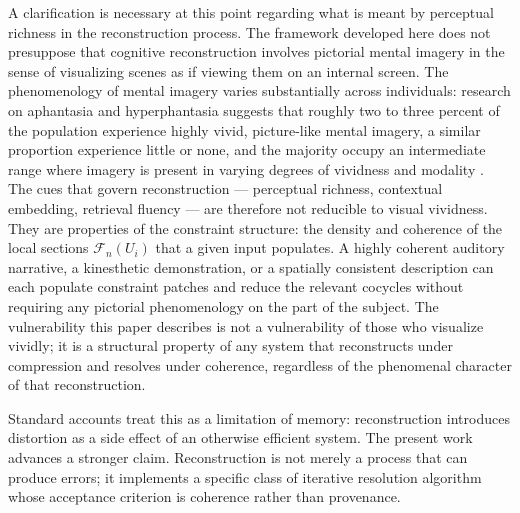 \documentclass[12pt, a4paper]{article}
\begin{document}
A clarification is necessary at this point regarding what is meant by perceptual richness in the reconstruction process. The framework developed here does not presuppose that cognitive reconstruction involves pictorial mental imagery in the sense of visualizing scenes as if viewing them on an internal screen. The phenomenology of mental imagery varies substantially across individuals: research on aphantasia and hyperphantasia suggests that roughly two to three percent of the population experience highly vivid, picture-like mental imagery, a similar proportion experience little or none, and the majority occupy an intermediate range where imagery is present in varying degrees of vividness and modality \cite{zeman2015}. The cues that govern reconstruction --- perceptual richness, contextual embedding, retrieval fluency --- are therefore not reducible to visual vividness. They are properties of the constraint structure: the density and coherence of the local sections $\mathcal{F}_n(U_i)$ that a given input populates. A highly coherent auditory narrative, a kinesthetic demonstration, or a spatially consistent description can each populate constraint patches and reduce the relevant cocycles without requiring any pictorial phenomenology on the part of the subject. The vulnerability this paper describes is not a vulnerability of those who visualize vividly; it is a structural property of any system that reconstructs under compression and resolves under coherence, regardless of the phenomenal character of that reconstruction.

Standard accounts treat this as a limitation of memory: reconstruction introduces distortion as a side effect of an otherwise efficient system. The present work advances a stronger claim. Reconstruction is not merely a process that can produce errors; it implements a specific class of iterative resolution algorithm whose acceptance criterion is coherence rather than provenance.
\end{document}
